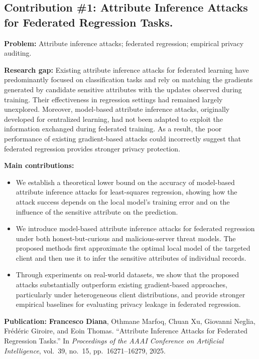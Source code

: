 \subsection*{Contribution \#1: Attribute Inference Attacks for Federated Regression Tasks.}

\noindent\textbf{Problem:}
Attribute inference attacks; federated regression; empirical privacy auditing.

\medskip
\noindent\textbf{Research gap:}
Existing attribute inference attacks for federated learning have predominantly
focused on classification tasks and rely on matching the gradients generated by
candidate sensitive attributes with the updates observed during training.
Their effectiveness in regression settings had remained largely unexplored.
Moreover, model-based attribute inference attacks, originally developed for
centralized learning, had not been adapted to exploit the information exchanged
during federated training. As a result, the poor performance of existing
gradient-based attacks could incorrectly suggest that federated regression
provides stronger privacy protection.

\noindent\textbf{Main contributions:}
\begin{itemize}
    \item We establish a theoretical lower bound on the accuracy of model-based
    attribute inference attacks for least-squares regression, showing how the
    attack success depends on the local model's training error and on the
    influence of the sensitive attribute on the prediction.

    \item We introduce model-based attribute inference attacks for federated
    regression under both honest-but-curious and malicious-server threat
    models. The proposed methods first approximate the optimal local model of
    the targeted client and then use it to infer the sensitive attributes of
    individual records.

    \item Through experiments on real-world datasets, we show that the proposed
    attacks substantially outperform existing gradient-based approaches,
    particularly under heterogeneous client distributions, and provide stronger
    empirical baselines for evaluating privacy leakage in federated regression.
\end{itemize}

\medskip
\noindent\textbf{Publication:}
 \textbf{Francesco Diana}, Othmane Marfoq, Chuan Xu, Giovanni Neglia,
    Frédéric Giroire, and Eoin Thomas.
    ``Attribute Inference Attacks for Federated Regression Tasks.''
    In \emph{Proceedings of the AAAI Conference on Artificial Intelligence},
    vol.~39, no.~15, pp.~16271--16279, 2025.



